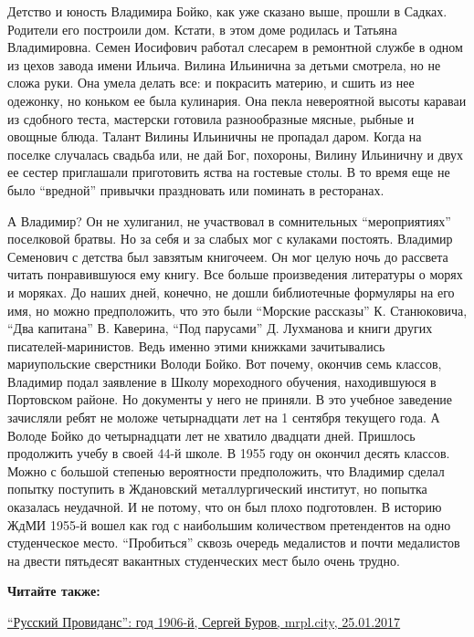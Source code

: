 Детство и юность Владимира Бойко, как уже сказано выше, прошли в Садках.
Родители его построили  дом. Кстати, в этом доме родилась и Татьяна
Владимировна. Семен Иосифович работал слесарем в ремонтной службе в одном из
цехов завода имени Ильича. Вилина Ильинична за детьми смотрела, но не сложа
руки. Она умела делать все: и покрасить материю, и сшить из нее одежонку, но
коньком ее была кулинария. Она пекла невероятной высоты караваи из сдобного
теста, мастерски готовила разнообразные мясные, рыбные и овощные блюда. Талант
Вилины Ильиничны не пропадал даром. Когда на поселке случалась свадьба или, не
дай Бог, похороны, Вилину Ильиничну и двух ее сестер приглашали приготовить
яства на гостевые столы. В то время еще не было \enquote{вредной} привычки праздновать
или поминать в ресторанах.

А Владимир? Он не хулиганил, не участвовал в сомнительных \enquote{мероприятиях}
поселковой братвы. Но за себя и за слабых мог с кулаками постоять. Владимир
Семенович с детства был завзятым книгочеем. Он мог целую ночь до рассвета
читать понравившуюся ему книгу. Все больше произведения литературы о морях и
моряках. До наших дней, конечно, не дошли библиотечные формуляры на его имя, но
можно предположить, что это были \enquote{Морские рассказы} К. Станюковича, \enquote{Два
капитана} В. Каверина, \enquote{Под парусами} Д. Лухманова и книги других
писателей-маринистов. Ведь именно этими книжками зачитывались мариупольские
сверстники Володи Бойко. Вот почему, окончив семь классов, Владимир подал
заявление в Школу мореходного обучения, находившуюся в Портовском районе. Но
документы у него не приняли. В это учебное заведение зачисляли  ребят не моложе
четырнадцати лет на 1 сентября текущего года. А Володе Бойко до четырнадцати
лет не хватило двадцати дней. Пришлось  продолжить учебу в своей 44-й школе. В
1955 году он окончил десять классов. Можно с большой степенью вероятности
предположить, что Владимир сделал попытку поступить в Ждановский
металлургический институт, но попытка оказалась неудачной. И не потому, что он
был плохо подготовлен. В историю ЖдМИ 1955-й вошел как год с наибольшим
количеством претендентов на одно студенческое место. \enquote{Пробиться} сквозь очередь
медалистов и почти медалистов на двести пятьдесят вакантных студенческих мест
было очень трудно.

\textbf{Читайте также:} 

\href{https://archive.org/details/25_01_2017.sergij_burov.mrpl_city.russkij_providans_god_1906}{%
\enquote{Русский Провиданс}: год 1906-й, Сергей Буров, mrpl.city, 25.01.2017}

